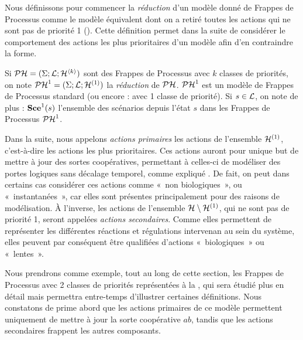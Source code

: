 Nous définissons pour commencer la \emph{réduction} d'un modèle donné de Frappes de Processus
comme le modèle équivalent dont on a retiré toutes les actions qui ne sont pas de priorité 1
().
Cette définition permet dans la suite de considérer le comportement des actions les plus prioritaires
d'un modèle afin d'en contraindre la forme.

\begin{definition}
  Si $\PH = (\PHs; \PHl; \PHh^{\langle k \rangle})$ sont des Frappes de Processus avec $k$
  classes de priorités, on note $\reduction[\PH] = (\PHs; \PHl; \PHh^{(1)})$
  la \emph{réduction} de $\PH$.
  $\reduction$ est un modèle de Frappes de Processus standard
  (ou encore : avec 1 classe de priorité).
  Si $s \in \PHl$, on note de plus : $\reduction[\Sce](s)$ l'ensemble des scénarios
  depuis l'état $s$ dans les Frappes de Processus $\reduction$.
\end{definition}


Dans la suite, nous appelons \emph{actions primaires} les actions de l'ensemble $\PHh^{(1)}$,
c'est-à-dire les actions les plus prioritaires.
Ces actions auront pour unique but de mettre à jour des sortes coopératives, permettant
à celles-ci de modéliser des portes logiques sans décalage temporel,
comme expliqué .
De fait, on peut dans certains cas considérer ces actions comme «~non biologiques~»,
ou «~instantanées~»,
car elles sont présentes principalement pour des raisons de modélisation.
À l'inverse, les actions de l'ensemble $\PHh \setminus \PHh^{(1)}$, qui ne sont pas de priorité 1,
seront appelées \emph{actions secondaires}.
Comme elles permettent de représenter les différentes réactions et régulations intervenan
au sein du
système, elles peuvent par conséquent être qualifiées d'actions «~biologiques~» ou «~lentes~».

\begin{example}
  Nous prendrons comme exemple, tout au long de cette section,
  les Frappes de Processus avec 2 classes de priorités représentées à la ,
  qui sera étudié plus en détail 
  mais permettra entre-temps d'illustrer certaines définitions.
  Nous constatons de prime abord que les actions primaires de ce modèle
  permettent uniquement de mettre à jour la sorte coopérative $ab$,
  tandis que les actions secondaires frappent les autres composants.
\end{example}


